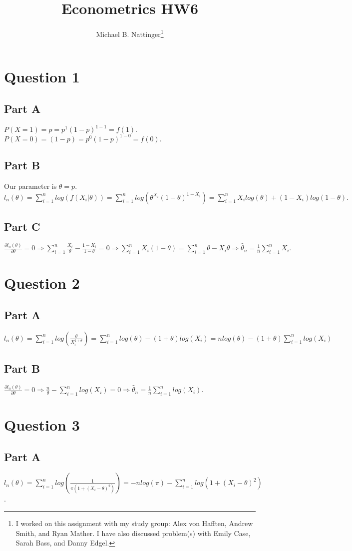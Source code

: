 \documentclass[11pt]{article} %
\title{Econometrics HW6}
\author{Michael B. Nattinger\footnote{I worked on this assignment with my study group: Alex von Hafften, Andrew Smith, and Ryan Mather. I have also discussed problem(s) with Emily Case, Sarah Bass, and Danny Edgel.}}
\begin{document}
\maketitle

\section{Question 1} %
\subsection{Part A}
$P(X=1) = p = p^{1}(1-p)^{1-1} = f(1).$ $P(X=0) = (1-p) = p^0(1-p)^{1-0} = f(0).$
\subsection{Part B}
Our parameter is $\theta = p.$ $l_n(\theta) = \sum_{i=1}^nlog(f(X_i|\theta)) = \sum_{i=1}^nlog(\theta^{X_i}(1-\theta)^{1-X_i})= \sum_{i=1}^nX_i log(\theta) + (1-X_i)log(1-\theta).$
\subsection{Part C}
$\frac{\partial l_n(\theta)}{\partial \theta} = 0 \Rightarrow \sum_{i=1}^n \frac{X_i}{\theta} -\frac{1-X_i}{1-\theta} = 0 \Rightarrow \sum_{i=1}^n X_i(1-\theta) = \sum_{i=1}^n \theta - X_i\theta \Rightarrow  \hat{\theta}_n = \frac{1}{n}\sum_{i=1}^nX_i.$
\section{Question 2} %
\subsection{Part A}
$l_n(\theta) = \sum_{i=1}^n log\left(\frac{\theta}{X_i^{1+\theta}}\right) = \sum_{i=1}^n log(\theta) - (1+\theta) log(X_i) = nlog(\theta) - (1+\theta) \sum_{i=1}^n log(X_i) $
\subsection{Part B}
$\frac{\partial l_n(\theta)}{\partial \theta} = 0 \Rightarrow \frac{n}{\theta} - \sum_{i=1}^n log(X_i) =0 \Rightarrow \hat{\theta}_n = \frac{1}{n} \sum_{i=1}^n log(X_i) $.
\section{Question 3} %
\subsection{Part A}
$l_n(\theta) = \sum_{i=1}^n log\left(\frac{1}{\pi(1+(X_i- \theta)^2)}\right) = - nlog(\pi) - \sum_{i=1}^n log(1 +(X_i- \theta)^2) $.
\end{document}
